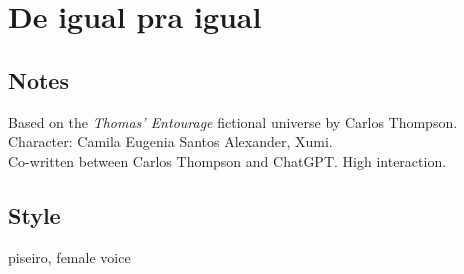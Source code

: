 \section{De igual pra igual}

\subsection{Notes}
Based on the \emph{Thomas' Entourage} fictional universe by Carlos Thompson.\\
Character: Camila Eugenia Santos Alexander, Xumi.\\
Co-written between Carlos Thompson and ChatGPT. High interaction.

\subsection{Style}
piseiro, female voice

